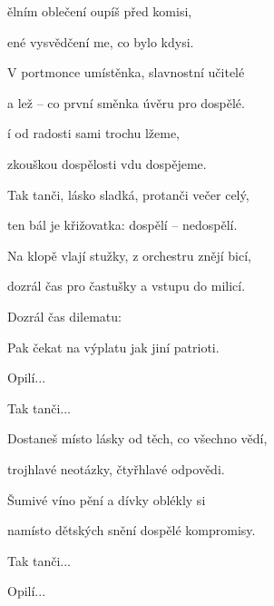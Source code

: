 

\zs
{}ělním oblečení oupíš před komisi,

ené vysvědčení me, co bylo kdysi.
\ks

\zs
V portmonce umístěnka, slavnostní učitelé

a lež -- co první směnka úvěru pro dospělé.
\ks

\zr
{}í od radosti  sami trochu lžeme,

 zkouškou dospělosti vdu dospějeme.
\kr

\zr
Tak tanči, lásko sladká, protanči večer celý,

ten bál je křižovatka: dospělí -- nedospělí.
\kr

\zs
Na klopě vlají stužky, z orchestru znějí bicí,

dozrál čas pro častušky a vstupu do milicí.
\ks

\zs
Dozrál čas dilematu: 

Pak čekat na výplatu jak jiní patrioti.
\ks

\zr Opilí... \kr

\zr Tak tanči... \kr

\zs
Dostaneš místo lásky od těch, co všechno vědí,

trojhlavé neotázky, čtyřhlavé odpovědi.
\ks

\zr
Šumivé víno pění a dívky oblékly si

namísto dětských snění dospělé kompromisy.
\kr

\zr Tak tanči... \kr

\zr Opilí... \kr

\kp


















